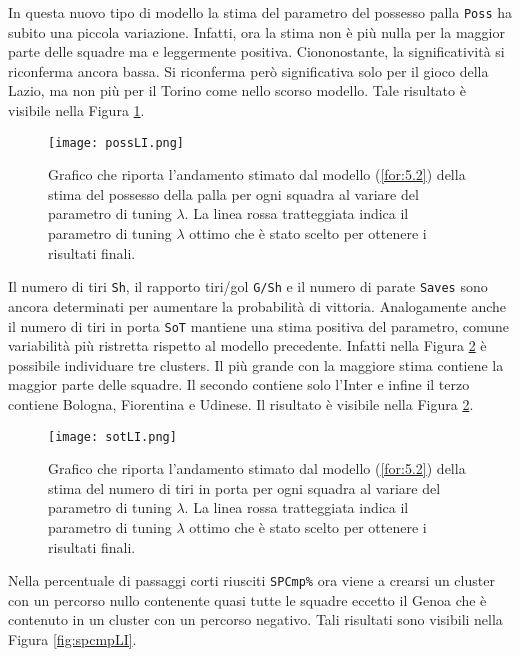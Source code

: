In questa nuovo tipo di modello la stima del parametro del possesso palla \texttt{Poss} ha subito una piccola variazione. Infatti, ora la stima non è più nulla per la maggior parte delle squadre ma e leggermente positiva. Ciononostante, la significatività si riconferma ancora bassa. Si riconferma però significativa solo per il gioco della Lazio, ma non più per il Torino come nello scorso modello. Tale risultato è visibile nella Figura \ref{fig:possLI}.\\
\begin{figure}[]
	\begin{center}
		\texttt{[image: possLI.png]}
		\caption{Grafico che riporta l'andamento stimato dal modello (\ref{for:5.2}) della stima del possesso della palla per ogni squadra al variare del parametro di tuning $\lambda$. La linea rossa tratteggiata indica il parametro di tuning $\lambda$ ottimo che è stato scelto per ottenere i risultati finali.} \label{fig:possLI}
	\end{center}
\end{figure}
Il numero di tiri \texttt{Sh}, il rapporto tiri/gol \texttt{G/Sh} e il numero di parate \texttt{Saves} sono ancora determinati per aumentare la probabilità di vittoria. Analogamente anche il numero di tiri in porta \texttt{SoT} mantiene una stima positiva del parametro, comune variabilità più ristretta rispetto al modello precedente. Infatti nella Figura \ref{fig:sotLI} è possibile individuare tre clusters. Il più grande con la maggiore stima contiene la maggior parte delle squadre. Il secondo contiene solo l'Inter e infine il terzo contiene Bologna, Fiorentina e Udinese. Il risultato è visibile nella Figura \ref{fig:sotLI}. \\
\begin{figure}[htbp]
	\begin{center}
		\texttt{[image: sotLI.png]}
		\caption{Grafico che riporta l'andamento stimato dal modello (\ref{for:5.2}) della stima del numero di tiri in porta per ogni squadra al variare del parametro di tuning $\lambda$. La linea rossa tratteggiata indica il parametro di tuning $\lambda$ ottimo che è stato scelto per ottenere i risultati finali.} \label{fig:sotLI}
	\end{center}
\end{figure}
Nella percentuale di passaggi corti riusciti \texttt{SPCmp\%} ora viene a crearsi un cluster con un percorso nullo contenente quasi tutte le squadre eccetto il Genoa che è contenuto in un cluster con un percorso negativo. Tali risultati sono visibili nella Figura \ref{fig:spcmpLI}.\\
